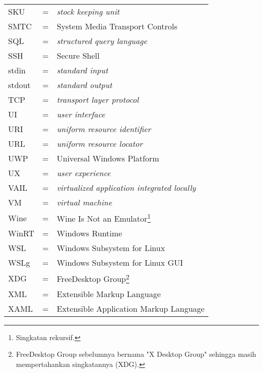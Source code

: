 \begin{longtable}{llp{3in}}
    SKU & \hspace{1.5cm} = & \textit{stock keeping unit}\\
    SMTC & \hspace {1.5cm} = & System Media Transport Controls\\
    SQL & \hspace{1.5cm} = & \textit{structured query language}\\
    SSH & \hspace{1.5cm} = & Secure Shell\\
    stdin & \hspace{1.5cm} = & \textit{standard input}\\
    stdout & \hspace{1.5cm} = & \textit{standard output}\\
    TCP & \hspace{1.5cm} = & \textit{transport layer protocol}\\
    UI & \hspace{1.5cm} = & \textit{user interface}\\
    URI & \hspace{1.5cm} = & \textit{uniform resource identifier}\\
    URL & \hspace{1.5cm} = & \textit{uniform resource locator}\\
    UWP & \hspace{1.5cm} = & Universal Windows Platform\\
    UX & \hspace{1.5cm} = & \textit{user experience}\\
    VAIL & \hspace{1.5cm} = & \textit{virtualized application integrated locally}\\
    VM & \hspace{1.5cm} = & \textit{virtual machine}\\
    Wine & \hspace{1.5cm} = & Wine Is Not an Emulator\footnote{Singkatan rekursif.}\\
    WinRT & \hspace{1.5cm} = & Windows Runtime\\
    WSL & \hspace{1.5cm} = & Windows Subsystem for Linux\\
    WSLg & \hspace{1.5cm} = & Windows Subsystem for Linux GUI\\
    XDG & \hspace{1.5cm} = & FreeDesktop Group\footnote{FreeDesktop Group sebelumnya bernama "X Desktop Group" sehingga masih mempertahankan singkatannya (XDG).}\\
    XML & \hspace{1.5cm} = & Extensible Markup Language\\
    XAML & \hspace{1.5cm} = & Extensible Application Markup Language
\end{longtable}
